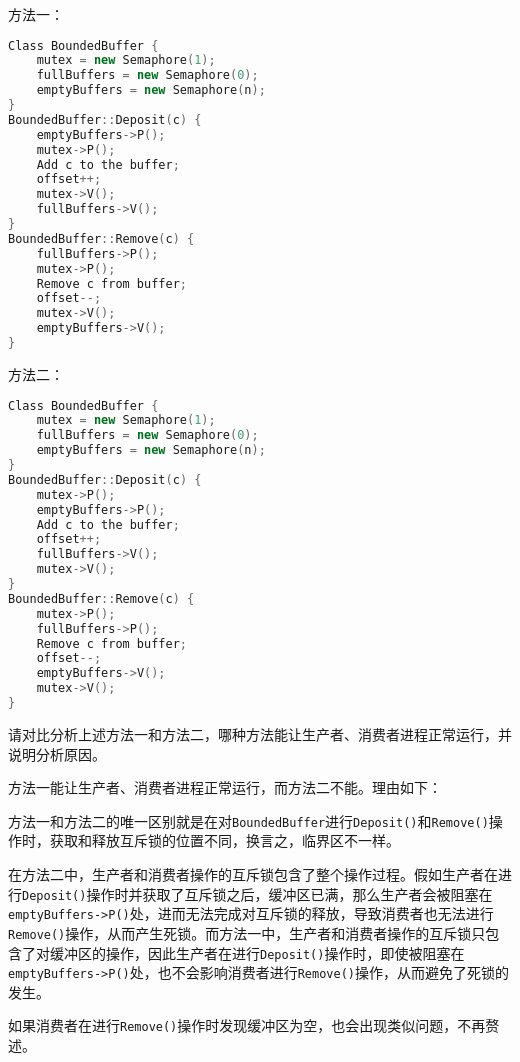 
方法一：

\begin{lstlisting}[language=C++]
Class BoundedBuffer {
    mutex = new Semaphore(1);
    fullBuffers = new Semaphore(0);
    emptyBuffers = new Semaphore(n);
}
BoundedBuffer::Deposit(c) {
    emptyBuffers->P();
    mutex->P();
    Add c to the buffer;
    offset++;
    mutex->V();
    fullBuffers->V();
}
BoundedBuffer::Remove(c) {
    fullBuffers->P();
    mutex->P();
    Remove c from buffer;
    offset--;
    mutex->V();
    emptyBuffers->V();
}
\end{lstlisting}

方法二：

\begin{lstlisting}[language=C++]
Class BoundedBuffer {
    mutex = new Semaphore(1);
    fullBuffers = new Semaphore(0);
    emptyBuffers = new Semaphore(n);
}
BoundedBuffer::Deposit(c) {
    mutex->P();
    emptyBuffers->P();
    Add c to the buffer;
    offset++;
    fullBuffers->V();
    mutex->V();
}
BoundedBuffer::Remove(c) {
    mutex->P();
    fullBuffers->P();
    Remove c from buffer;
    offset--;
    emptyBuffers->V();
    mutex->V();
}
\end{lstlisting}

请对比分析上述方法一和方法二，哪种方法能让生产者、消费者进程正常运行，并说明分析原因。

\begin{solution}

方法一能让生产者、消费者进程正常运行，而方法二不能。理由如下：

方法一和方法二的唯一区别就是在对{\tt BoundedBuffer}进行{\tt Deposit()}和{\tt Remove()}操作时，获取和释放互斥锁的位置不同，换言之，临界区不一样。

在方法二中，生产者和消费者操作的互斥锁包含了整个操作过程。假如生产者在进行{\tt Deposit()}操作时并获取了互斥锁之后，缓冲区已满，那么生产者会被阻塞在{\tt emptyBuffers->P()}处，进而无法完成对互斥锁的释放，导致消费者也无法进行{\tt Remove()}操作，从而产生死锁。而方法一中，生产者和消费者操作的互斥锁只包含了对缓冲区的操作，因此生产者在进行{\tt Deposit()}操作时，即使被阻塞在{\tt emptyBuffers->P()}处，也不会影响消费者进行{\tt Remove()}操作，从而避免了死锁的发生。

如果消费者在进行{\tt Remove()}操作时发现缓冲区为空，也会出现类似问题，不再赘述。

\end{solution}
